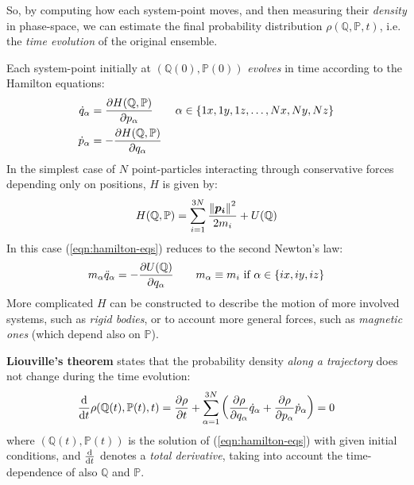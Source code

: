 \documentclass[../../main.tex]{subfiles}
\begin{document}
So, by computing how each system-point moves, and then measuring their \textit{density} in phase-space, we can estimate the final probability distribution $\rho(\mathbb{Q},\mathbb{P},t)$, i.e. the \textit{time evolution} of the original ensemble. 

\medskip

Each system-point initially at $(\mathbb{Q}(0), \mathbb{P}(0))$ \textit{evolves} in time according to the Hamilton equations:
\begin{align}\label{eqn:hamilton-eqs}
    \dot{q}_\alpha &= \pdv{H(\mathbb{Q},\mathbb{P})}{p_\alpha}\qquad \alpha \in \{1x, 1y, 1z,\dots, Nx, Ny, Nz\}\\
    \dot{p}_{\alpha} &= -\pdv{H(\mathbb{Q},\mathbb{P})}{q_\alpha}
\end{align} 
In the simplest case of $N$ point-particles interacting through conservative forces depending only on positions, $H$ is given by:
\begin{align*}
    H(\mathbb{Q},\mathbb{P}) = \sum_{i=1}^{3N} \frac{\norm{\bm{p_i}}^2}{2m_i} + U(\mathbb{Q}) 
\end{align*}
In this case (\ref{eqn:hamilton-eqs}) reduces to the second Newton's law:
\begin{align}\label{eqn:newton-eqs}
    m_\alpha \ddot{q}_\alpha = - \pdv{U(\mathbb{Q})}{q_\alpha} \qquad m_\alpha \equiv m_i \text{ if } \alpha \in \{ix,iy,iz\}
\end{align}
More complicated $H$ can be constructed to describe the motion of more involved systems, such as \textit{rigid bodies}, or to account more general forces, such as \textit{magnetic ones} (which depend also on $\mathbb{P}$).

\medskip

\textbf{Liouville's theorem} states that the probability density \textit{along a trajectory} does not change during the time evolution: 
\begin{align}\label{eqn:Liouville}
    \dv{t} \rho(\mathbb{Q}(t), \mathbb{P}(t),t) = \pdv{\rho}{t} + \sum_{\alpha=1}^{3N} \left(\pdv{\rho}{q_\alpha} \dot{q}_\alpha + \pdv{\rho}{p_\alpha} \dot{p}_\alpha\right) = 0
\end{align}
where $(\mathbb{Q}(t), \mathbb{P}(t))$ is the solution of (\ref{eqn:hamilton-eqs}) with given initial conditions, and $\dv{t}$ denotes a \textit{total derivative}, taking into account the time-dependence of also $\mathbb{Q}$ and $\mathbb{P}$.  
\end{document}
